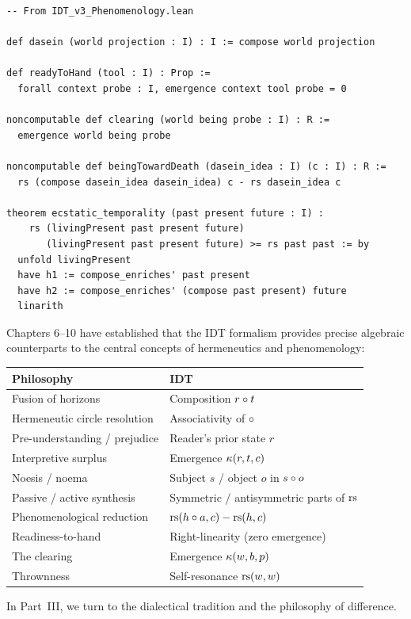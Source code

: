 \begin{lstlisting}
-- From IDT_v3_Phenomenology.lean

def dasein (world projection : I) : I := compose world projection

def readyToHand (tool : I) : Prop :=
  forall context probe : I, emergence context tool probe = 0

noncomputable def clearing (world being probe : I) : R :=
  emergence world being probe

noncomputable def beingTowardDeath (dasein_idea : I) (c : I) : R :=
  rs (compose dasein_idea dasein_idea) c - rs dasein_idea c

theorem ecstatic_temporality (past present future : I) :
    rs (livingPresent past present future)
       (livingPresent past present future) >= rs past past := by
  unfold livingPresent
  have h1 := compose_enriches' past present
  have h2 := compose_enriches' (compose past present) future
  linarith
\end{lstlisting}

\begin{remark}
Chapters 6--10 have established that the IDT formalism provides precise
algebraic counterparts to the central concepts of hermeneutics and
phenomenology:
\begin{center}
\begin{tabular}{ll}
\textbf{Philosophy} & \textbf{IDT} \\
\hline
Fusion of horizons & Composition $r \circ t$ \\
Hermeneutic circle resolution & Associativity of $\circ$ \\
Pre-understanding / prejudice & Reader's prior state $r$ \\
Interpretive surplus & Emergence $\kappa(r, t, c)$ \\
Noesis / noema & Subject $s$ / object $o$ in $s \circ o$ \\
Passive / active synthesis & Symmetric / antisymmetric parts of $\mathrm{rs}$ \\
Phenomenological reduction & $\mathrm{rs}(h \circ a, c) - \mathrm{rs}(h, c)$ \\
Readiness-to-hand & Right-linearity (zero emergence) \\
The clearing & Emergence $\kappa(w, b, p)$ \\
Thrownness & Self-resonance $\mathrm{rs}(w, w)$ \\
\end{tabular}
\end{center}
In Part~III, we turn to the dialectical tradition and the philosophy of
difference.
\end{remark}


